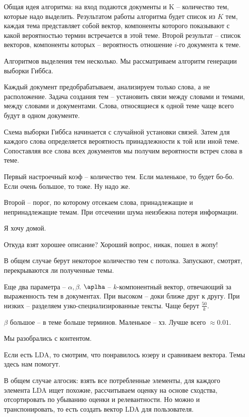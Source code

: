 Общая идея алгоритма: на вход подаются документы и K -- количество тем, которые надо выделить. Результатом работы алгоритма будет список из $K$ тем, каждая тема представляет собой вектор, компоненты которого показывают с какой вероятностью термин встречается в этой теме. Второй результат -- список векторов, компоненты которых -- вероятность отношение $i$-го документа к теме.

Алгоритмов выделения тем несколько. Мы рассматриваем алгоритм генерации выборки Гиббса.

Каждый документ предобрабатываем, анализируем только слова, а не расположение. Задача создания тем -- установить связи между словами и темами, между словами и документами. Слова, относящиеся к одной теме чаще всего будут в одном документе.

Схема выборки Гиббса начинается с случайной установки связей. Затем для каждого слова определяется вероятность принадлежности к той или иной теме. Сопоставляя все слова всех документов мы получим вероятности встреч слова в теме.

Первый настроечный коэф -- количество тем. Если маленькое, то будет бо-бо. Если очень большое, то тоже. Ну надо же.

Второй -- порог, по которому отсекаем слова, принадлежащие и непринадлежащие темам. При отсечении шума неизбежна потеря информации.

Я хочу домой.

Откуда взят хорошее описание? Хороший вопрос, никак, пошел в жопу!

В общем случае берут некоторое количество тем с потолка. Запускают, смотрят, перекрываются ли полученные темы. 

Еще два параметра -- $\alpha, \beta$. $\aplha$ -- $k$-компонентный вектор, отвечающий за выраженность тем в документах. При высоком -- доки ближе друг к другу. При низких -- разделяем узко-специализированные тексты. Чаще берут $\frac{50}{k}$.

$\beta$ большое -- в теме больше терминов. Маленькое -- хз. Лучше всего $\approx 0.01$.

Мы разобрались с контентом.


Если есть LDA, то смотрим, что понравилось юзеру и сравниваем вектора. Темы здесь нам помогут.

В общем случае алгосик: взять все потребленные элементы, для каждого элемента LDA ищет похожие, рассчитываем оценку на основе сходства, отсортировать по убыванию оценки и релевантности. Но можно и транспонировать, то есть создать вектор LDA для пользователя.

